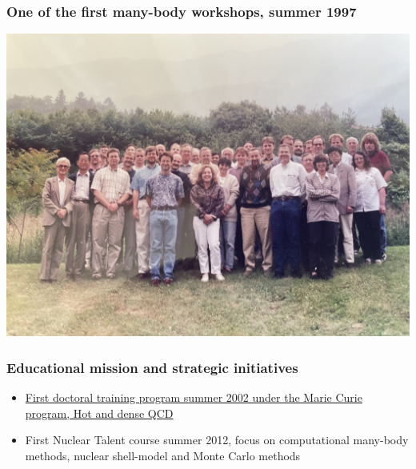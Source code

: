 \documentclass{beamer}
\begin{document}
\begin{frame}
\frametitle{One of the first many-body workshops, summer 1997}

\vspace{6mm}

\centerline{\includegraphics[width=1.0\linewidth]{Photos/manybody1997.jpeg}}

\vspace{6mm}
\end{frame}

\begin{frame}
\frametitle{Educational mission and strategic initiatives}

\begin{itemize}
\item \href{{https://www.ectstar.eu/wp-content/uploads/2020/07/annualrep2002.pdf}}{First doctoral training program summer 2002 under the Marie Curie program, Hot and dense QCD}

\item First Nuclear Talent course summer 2012, focus on computational many-body methods, nuclear shell-model and Monte Carlo methods
\end{itemize}

\noindent
\end{frame}
\end{document}
